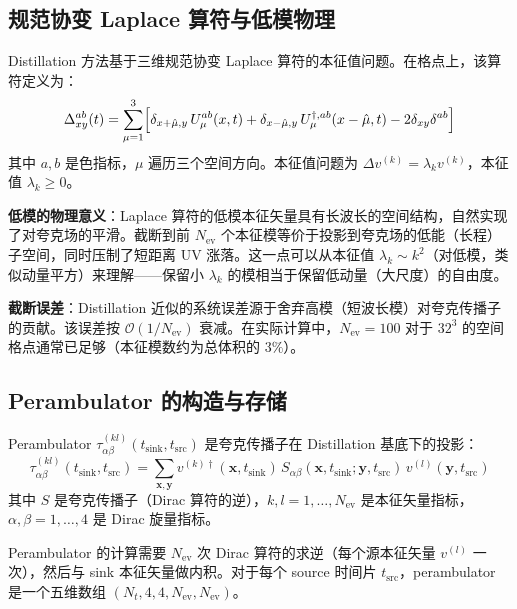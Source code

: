 \documentclass[11pt,a4paper]{ctexart}
\newcommand{\order}[1]{\mathcal{O}(#1)}
\begin{document}
\subsection{规范协变 Laplace 算符与低模物理}

Distillation 方法基于三维规范协变 Laplace 算符的本征值问题。在格点上，该算符定义为：
\begin{equation}\label{eq:laplace}
\Delta^{ab}_{xy}(t) = \sum_{\mu=1}^{3} \Bigl[
\delta_{x+\hat{\mu},y} \, U_\mu^{ab}(x,t) +
\delta_{x-\hat{\mu},y} \, U_\mu^{\dagger, ab}(x-\hat{\mu},t) -
2\delta_{xy}\delta^{ab} \Bigr]
\end{equation}
其中 $a,b$ 是色指标，$\mu$ 遍历三个空间方向。本征值问题为 $\Delta v^{(k)} = \lambda_k v^{(k)}$，本征值 $\lambda_k \ge 0$。

\textbf{低模的物理意义}：Laplace 算符的低模本征矢量具有长波长的空间结构，自然实现了对夸克场的平滑。截断到前 $N_{\text{ev}}$ 个本征模等价于投影到夸克场的低能（长程）子空间，同时压制了短距离 UV 涨落。这一点可以从本征值 $\lambda_k \sim k^2$（对低模，类似动量平方）来理解——保留小 $\lambda_k$ 的模相当于保留低动量（大尺度）的自由度。

\textbf{截断误差}：Distillation 近似的系统误差源于舍弃高模（短波长模）对夸克传播子的贡献。该误差按 $\order{1/N_{\text{ev}}}$ 衰减。在实际计算中，$N_{\text{ev}} = 100$ 对于 $32^3$ 的空间格点通常已足够（本征模数约为总体积的 $3\%$）。

\subsection{Perambulator 的构造与存储}

Perambulator $\tau^{(kl)}_{\alpha\beta}(t_{\text{sink}}, t_{\text{src}})$ 是夸克传播子在 Distillation 基底下的投影：
\begin{equation}\label{eq:peram_def}
\tau^{(kl)}_{\alpha\beta}(t_{\text{sink}}, t_{\text{src}}) =
\sum_{\mathbf{x}, \mathbf{y}} v^{(k)\dagger}(\mathbf{x}, t_{\text{sink}}) \,
S_{\alpha\beta}(\mathbf{x},t_{\text{sink}}; \mathbf{y},t_{\text{src}}) \,
v^{(l)}(\mathbf{y}, t_{\text{src}})
\end{equation}
其中 $S$ 是夸克传播子（Dirac 算符的逆），$k,l=1,\ldots,N_{\text{ev}}$ 是本征矢量指标，$\alpha,\beta=1,\ldots,4$ 是 Dirac 旋量指标。

Perambulator 的计算需要 $N_{\text{ev}}$ 次 Dirac 算符的求逆（每个源本征矢量 $v^{(l)}$ 一次），然后与 sink 本征矢量做内积。对于每个 source 时间片 $t_{\text{src}}$，perambulator 是一个五维数组 $(N_t, 4, 4, N_{\text{ev}}, N_{\text{ev}})$。
\end{document}
